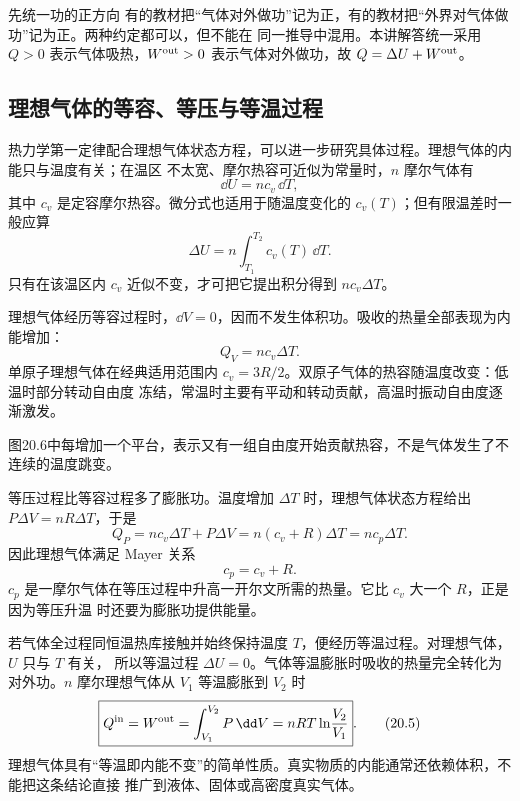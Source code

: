 \begin{warningbox}{先统一功的正方向}
有的教材把“气体对外做功”记为正，有的教材把“外界对气体做功”记为正。两种约定都可以，但不能在
同一推导中混用。本讲解答统一采用 $Q>0$ 表示气体吸热，$W^{\rm out}>0$ 表示气体对外做功，故
$Q=\Delta U+W^{\rm out}$。
\end{warningbox}

\subsection*{理想气体的等容、等压与等温过程}

热力学第一定律配合理想气体状态方程，可以进一步研究具体过程。理想气体的内能只与温度有关；在温区
不太宽、摩尔热容可近似为常量时，$n$ 摩尔气体有
\begin{equation*}
  \dd U=n c_v\,\dd T,
\end{equation*}
其中 $c_v$ 是定容摩尔热容。微分式也适用于随温度变化的 $c_v(T)$；但有限温差时一般应算
\[
 \Delta U=n\int_{T_1}^{T_2}c_v(T)\,\dd T.
\]
只有在该温区内 $c_v$ 近似不变，才可把它提出积分得到 $n c_v\Delta T$。

理想气体经历等容过程时，$\dd V=0$，因而不发生体积功。吸收的热量全部表现为内能增加：
\begin{equation*}
  \boxed{Q_V=n c_v\Delta T}.
\end{equation*}
单原子理想气体在经典适用范围内 $c_v=3R/2$。双原子气体的热容随温度改变：低温时部分转动自由度
冻结，常温时主要有平动和转动贡献，高温时振动自由度逐渐激发。

\heatCapacityRedraw
{}
图20.6中每增加一个平台，表示又有一组自由度开始贡献热容，不是气体发生了不连续的温度跳变。

等压过程比等容过程多了膨胀功。温度增加 $\Delta T$ 时，理想气体状态方程给出
$P\Delta V=nR\Delta T$，于是
\begin{equation*}
  Q_P=n c_v\Delta T+P\Delta V
  =n(c_v+R)\Delta T=n c_p\Delta T.
\end{equation*}
因此理想气体满足 Mayer 关系
\begin{equation*}
  \boxed{c_p=c_v+R}.
\end{equation*}
$c_p$ 是一摩尔气体在等压过程中升高一开尔文所需的热量。它比 $c_v$ 大一个 $R$，正是因为等压升温
时还要为膨胀功提供能量。

若气体全过程同恒温热库接触并始终保持温度 $T$，便经历等温过程。对理想气体，$U$ 只与 $T$ 有关，
所以等温过程 $\Delta U=0$。气体等温膨胀时吸收的热量完全转化为对外功。$n$ 摩尔理想气体从 $V_1$
等温膨胀到 $V_2$ 时
\begin{equation}
  \boxed{Q^{\rm in}=W^{\rm out}
  =\int_{V_1}^{V_2}P\,\dd V
  =nRT\ln\!\frac{V_2}{V_1}}. \tag{20.5}
\end{equation}
理想气体具有“等温即内能不变”的简单性质。真实物质的内能通常还依赖体积，不能把这条结论直接
推广到液体、固体或高密度真实气体。

